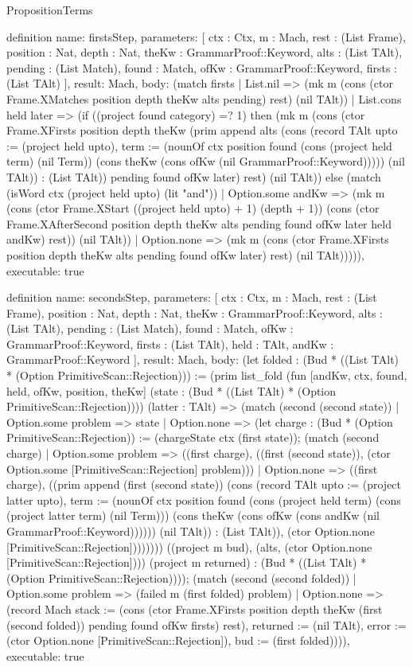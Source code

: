 \begin{lexlean}{PropositionTerms}
\begin{semanticmodule}
definition{
  name: firstsStep,
  parameters: [
    ctx : Ctx,
    m : Mach,
    rest : (List Frame),
    position : Nat,
    depth : Nat,
    theKw : GrammarProof::Keyword,
    alts : (List TAlt),
    pending : (List Match),
    found : Match,
    ofKw : GrammarProof::Keyword,
    firsts : (List TAlt)
  ],
  result: Mach,
  body: (match firsts
    | List.nil => (mk m (cons (ctor Frame.XMatches position depth theKw alts pending) rest) (nil TAlt))
    | List.cons held later => (if ((project found category) =? 1) then (mk m (cons (ctor Frame.XFirsts position depth theKw (prim append alts (cons (record TAlt {upto := (project held upto), term := (nounOf ctx position found (cons (project held term) (nil Term)) (cons theKw (cons ofKw (nil GrammarProof::Keyword))))}) (nil TAlt)) : (List TAlt)) pending found ofKw later) rest) (nil TAlt)) else (match (isWord ctx (project held upto) (lit "and"))
      | Option.some andKw => (mk m (cons (ctor Frame.XStart ((project held upto) + 1) (depth + 1)) (cons (ctor Frame.XAfterSecond position depth theKw alts pending found ofKw later held andKw) rest)) (nil TAlt))
      | Option.none => (mk m (cons (ctor Frame.XFirsts position depth theKw alts pending found ofKw later) rest) (nil TAlt))))),
  executable: true
}

definition{
  name: secondsStep,
  parameters: [
    ctx : Ctx,
    m : Mach,
    rest : (List Frame),
    position : Nat,
    depth : Nat,
    theKw : GrammarProof::Keyword,
    alts : (List TAlt),
    pending : (List Match),
    found : Match,
    ofKw : GrammarProof::Keyword,
    firsts : (List TAlt),
    held : TAlt,
    andKw : GrammarProof::Keyword
  ],
  result: Mach,
  body: (let folded : (Bud * ((List TAlt) * (Option PrimitiveScan::Rejection))) := (prim list_fold (fun [andKw, ctx, found, held, ofKw, position, theKw] (state : (Bud * ((List TAlt) * (Option PrimitiveScan::Rejection)))) (latter : TAlt) => (match (second (second state))
    | Option.some problem => state
    | Option.none => (let charge : (Bud * (Option PrimitiveScan::Rejection)) := (chargeState ctx (first state)); (match (second charge)
      | Option.some problem => ((first charge), ((first (second state)), (ctor Option.some [PrimitiveScan::Rejection] problem)))
      | Option.none => ((first charge), ((prim append (first (second state)) (cons (record TAlt {upto := (project latter upto), term := (nounOf ctx position found (cons (project held term) (cons (project latter term) (nil Term))) (cons theKw (cons ofKw (cons andKw (nil GrammarProof::Keyword)))))}) (nil TAlt)) : (List TAlt)), (ctor Option.none [PrimitiveScan::Rejection]))))))) ((project m bud), (alts, (ctor Option.none [PrimitiveScan::Rejection]))) (project m returned) : (Bud * ((List TAlt) * (Option PrimitiveScan::Rejection)))); (match (second (second folded))
    | Option.some problem => (failed m (first folded) problem)
    | Option.none => (record Mach {stack := (cons (ctor Frame.XFirsts position depth theKw (first (second folded)) pending found ofKw firsts) rest), returned := (nil TAlt), error := (ctor Option.none [PrimitiveScan::Rejection]), bud := (first folded)}))),
  executable: true
}


\end{semanticmodule}
\end{lexlean}
